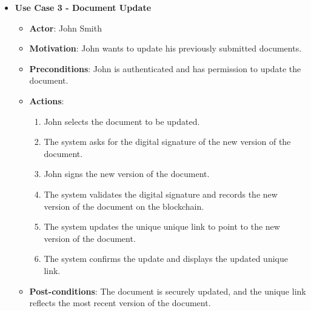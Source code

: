 \documentclass[a4paper,11pt]{article}
\begin{document}
\begin{itemize}
            \item \textbf{Use Case 3 - Document Update}
            \begin{itemize}
                \item \textbf{Actor}: John Smith
                \item \textbf{Motivation}: John wants to update his previously submitted documents.
                \item \textbf{Preconditions}: John is authenticated and has permission to update the document.
                \item \textbf{Actions}:
                \begin{enumerate}
                    \item John selects the document to be updated.
                    \item The system asks for the digital signature of the new version of the document.
                    \item John signs the new version of the document.
                    \item The system validates the digital signature and records the new version of the document on the blockchain.
                    \item The system updates the unique unique link to point to the new version of the document.
                    \item The system confirms the update and displays the updated unique link.
                \end{enumerate}
                \item \textbf{Post-conditions}: The document is securely updated, and the unique link reflects the most recent version of the document.
            \end{itemize}
            

\end{itemize}
\end{document}
